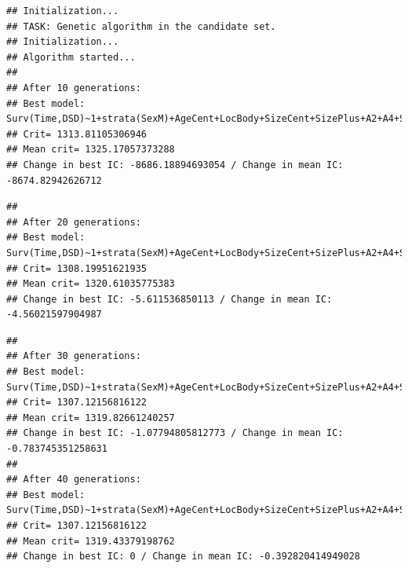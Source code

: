 \documentclass{article}\usepackage[]{graphicx}\usepackage[]{color}
\makeatletter
\newenvironment{kframe}{%
 \def\at@end@of@kframe{}%
 \ifinner\ifhmode%
  \def\at@end@of@kframe{\end{minipage}}%
  \begin{minipage}{\columnwidth}%
 \fi\fi%
 \def\FrameCommand##1{\hskip\@totalleftmargin \hskip-\fboxsep
 \colorbox{shadecolor}{##1}\hskip-\fboxsep
     \hskip-\linewidth \hskip-\@totalleftmargin \hskip\columnwidth}%
 \MakeFramed {\advance\hsize-\width
   \@totalleftmargin\z@ \linewidth\hsize
   \@setminipage}}%
 {\par\unskip\endMakeFramed%
 \at@end@of@kframe}
\newenvironment{knitrout}{}{} %
\makeatother
\begin{document}
\begin{knitrout}
\begin{kframe}
\begin{alltt}
\end{alltt}
\begin{verbatim}
## Initialization...
## TASK: Genetic algorithm in the candidate set.
## Initialization...
## Algorithm started...
## 
## After 10 generations:
## Best model: Surv(Time,DSD)~1+strata(SexM)+AgeCent+LocBody+SizeCent+SizePlus+A2+A4+SizeCent:AgeCent+SizePlus:LocBody+A2:SizePlus+A4:SizeCent+strata(SexM):LocBody
## Crit= 1313.81105306946
## Mean crit= 1325.17057373288
## Change in best IC: -8686.18894693054 / Change in mean IC: -8674.82942626712
\end{verbatim}


{\ttfamily\noindent\color{warningcolor}{\#\# Warning in fitter(X, Y, strats, offset, init, control, weights = weights, : Loglik converged before variable\ \ 19 ; beta may be infinite.}}\begin{verbatim}
## 
## After 20 generations:
## Best model: Surv(Time,DSD)~1+strata(SexM)+AgeCent+LocBody+SizeCent+SizePlus+A2+A4+SizeCent:AgeCent+A2:SizePlus+strata(SexM):SizeCent
## Crit= 1308.19951621935
## Mean crit= 1320.61035775383
## Change in best IC: -5.611536850113 / Change in mean IC: -4.56021597904987
\end{verbatim}


{\ttfamily\noindent\color{warningcolor}{\#\# Warning in fitter(X, Y, strats, offset, init, control, weights = weights, : Loglik converged before variable\ \ 7 ; beta may be infinite.}}\begin{verbatim}
## 
## After 30 generations:
## Best model: Surv(Time,DSD)~1+strata(SexM)+AgeCent+LocBody+SizeCent+SizePlus+A2+A4+SizeCent:AgeCent+strata(SexM):SizeCent
## Crit= 1307.12156816122
## Mean crit= 1319.82661240257
## Change in best IC: -1.07794805812773 / Change in mean IC: -0.783745351258631
## 
## After 40 generations:
## Best model: Surv(Time,DSD)~1+strata(SexM)+AgeCent+LocBody+SizeCent+SizePlus+A2+A4+SizeCent:AgeCent+strata(SexM):SizeCent
## Crit= 1307.12156816122
## Mean crit= 1319.43379198762
## Change in best IC: 0 / Change in mean IC: -0.392820414949028
\end{verbatim}



\end{kframe}
\end{knitrout}
\end{document}
